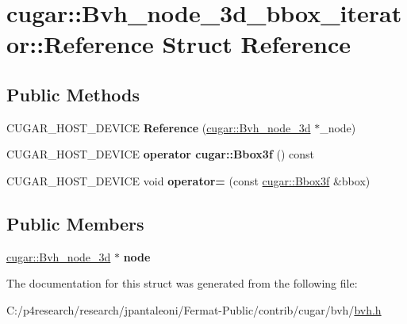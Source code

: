 \hypertarget{structcugar_1_1_bvh__node__3d__bbox__iterator_1_1_reference}{}\section{cugar\+:\+:Bvh\+\_\+node\+\_\+3d\+\_\+bbox\+\_\+iterator\+:\+:Reference Struct Reference}
\label{structcugar_1_1_bvh__node__3d__bbox__iterator_1_1_reference}
\subsection*{Public Methods}
\begin{DoxyCompactItemize}
\item 
\mbox{\label{structcugar_1_1_bvh__node__3d__bbox__iterator_1_1_reference_ad0d79a30569a0b88d52b4a610e54c530}} 
C\+U\+G\+A\+R\+\_\+\+H\+O\+S\+T\+\_\+\+D\+E\+V\+I\+CE {\bfseries Reference} (\hyperlink{structcugar_1_1_bvh__node__3d}{cugar\+::\+Bvh\+\_\+node\+\_\+3d} $\ast$\+\_\+node)
\item 
\mbox{\label{structcugar_1_1_bvh__node__3d__bbox__iterator_1_1_reference_a3b0b04730089a4322c4d076a075d71be}} 
C\+U\+G\+A\+R\+\_\+\+H\+O\+S\+T\+\_\+\+D\+E\+V\+I\+CE {\bfseries operator cugar\+::\+Bbox3f} () const
\item 
\mbox{\label{structcugar_1_1_bvh__node__3d__bbox__iterator_1_1_reference_a6863d27bdecb2550bcf31dbca91fd5d2}} 
C\+U\+G\+A\+R\+\_\+\+H\+O\+S\+T\+\_\+\+D\+E\+V\+I\+CE void {\bfseries operator=} (const \hyperlink{structcugar_1_1_bbox}{cugar\+::\+Bbox3f} \&bbox)
\end{DoxyCompactItemize}
\subsection*{Public Members}
\begin{DoxyCompactItemize}
\item 
\mbox{\label{structcugar_1_1_bvh__node__3d__bbox__iterator_1_1_reference_a31d7804d9a613e547e59e7c224c27732}} 
\hyperlink{structcugar_1_1_bvh__node__3d}{cugar\+::\+Bvh\+\_\+node\+\_\+3d} $\ast$ {\bfseries node}
\end{DoxyCompactItemize}


The documentation for this struct was generated from the following file\+:\begin{DoxyCompactItemize}
\item 
C\+:/p4research/research/jpantaleoni/\+Fermat-\/\+Public/contrib/cugar/bvh/\hyperlink{bvh_8h}{bvh.\+h}\end{DoxyCompactItemize}
